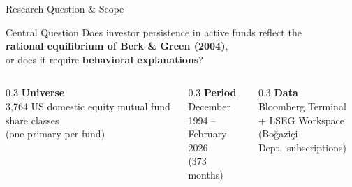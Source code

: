 \documentclass[10pt, aspectratio=169]{beamer}
\begin{document}
\begin{frame}{Research Question \& Scope}
  \begin{block}{\large Central Question}
    \centering
    Does investor persistence in active funds reflect the\\
    \textbf{rational equilibrium of Berk \& Green (2004)},\\
    or does it require \textbf{behavioral explanations}?
  \end{block}
  \vspace{10pt}
  \begin{columns}[T]
    \begin{column}{0.3\textwidth}
      \textbf{Universe}\\
      3,764 US domestic equity mutual fund share classes\\
      (one primary per fund)
    \end{column}
    \begin{column}{0.3\textwidth}
      \textbf{Period}\\
      December 1994 –\\
      February 2026\\
      (373 months)
    \end{column}
    \begin{column}{0.3\textwidth}
      \textbf{Data}\\
      Bloomberg Terminal\\ + LSEG Workspace\\
      (Boğaziçi Dept.\ subscriptions)
    \end{column}
  \end{columns}
\end{frame}
\end{document}
